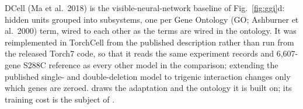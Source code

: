 \clearpage
{}

DCell (Ma et al.\ 2018) is the visible-neural-network baseline of Fig.~\ref{fig:ggi}d: hidden
units grouped into subsystems, one per Gene Ontology (GO; Ashburner et al.\ 2000) term, wired
to each other as the terms are wired in the ontology. It was reimplemented in TorchCell from
the published description rather than run from the released Torch7 code, so that it reads the
same experiment records and 6,607-gene S288C reference as every other model in the
comparison; extending the published single- and double-deletion model to trigenic
interaction changes only which genes are zeroed.  draws the
adaptation and  the ontology it is built on; its training cost
is the subject of .

